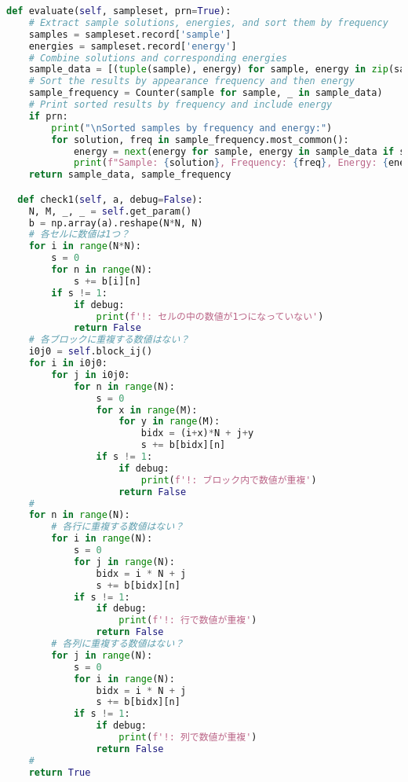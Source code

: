 \documentclass[uplatex,dvipdfmx,a4paper,11pt,oneside,openany]{jsbook}
\begin{document}
\begin{lstlisting}[language=Python]
  def evaluate(self, sampleset, prn=True):
    # Extract sample solutions, energies, and sort them by frequency
    samples = sampleset.record['sample']
    energies = sampleset.record['energy']
    # Combine solutions and corresponding energies
    sample_data = [(tuple(sample), energy) for sample, energy in zip(samples, energies)]
    # Sort the results by appearance frequency and then energy
    sample_frequency = Counter(sample for sample, _ in sample_data)
    # Print sorted results by frequency and include energy
    if prn:
        print("\nSorted samples by frequency and energy:")
        for solution, freq in sample_frequency.most_common():
            energy = next(energy for sample, energy in sample_data if sample == solution)
            print(f"Sample: {solution}, Frequency: {freq}, Energy: {energy:+.2f}")
    return sample_data, sample_frequency

  def check1(self, a, debug=False):
    N, M, _, _ = self.get_param()
    b = np.array(a).reshape(N*N, N)
    # 各セルに数値は1つ？
    for i in range(N*N):
        s = 0
        for n in range(N):
            s += b[i][n]
        if s != 1:
            if debug:
                print(f'!: セルの中の数値が1つになっていない')
            return False
    # 各ブロックに重複する数値はない？
    i0j0 = self.block_ij()
    for i in i0j0:
        for j in i0j0:
            for n in range(N):
                s = 0
                for x in range(M):
                    for y in range(M):
                        bidx = (i+x)*N + j+y
                        s += b[bidx][n]
                if s != 1:
                    if debug:
                        print(f'!: ブロック内で数値が重複')
                    return False
    #
    for n in range(N):
        # 各行に重複する数値はない？
        for i in range(N):
            s = 0
            for j in range(N):
                bidx = i * N + j
                s += b[bidx][n]
            if s != 1:
                if debug:
                    print(f'!: 行で数値が重複')
                return False
        # 各列に重複する数値はない？
        for j in range(N):
            s = 0
            for i in range(N):
                bidx = i * N + j
                s += b[bidx][n]
            if s != 1:
                if debug:
                    print(f'!: 列で数値が重複')
                return False
    #
    return True


\end{lstlisting}
\end{document}
